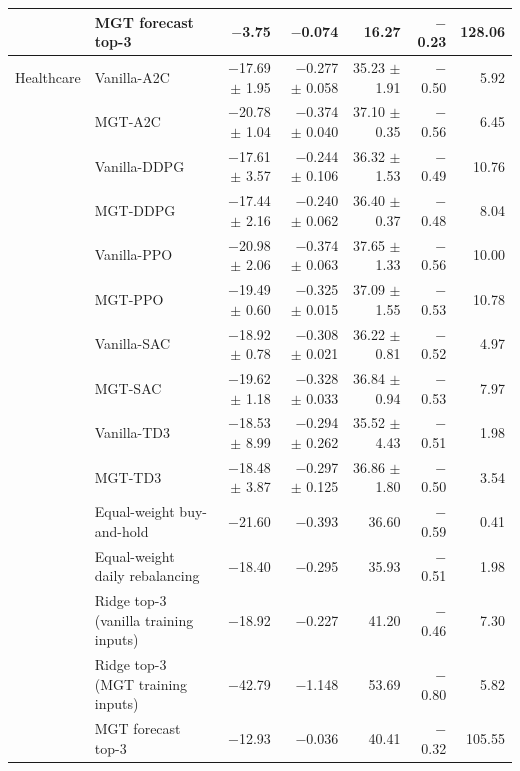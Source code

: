 \begin{table}[!t]
{\begin{tabular}{llrrrrr}
 & MGT forecast top-3 & $-$3.75 & $-$0.074 & 16.27 & $-$0.23 & 128.06 \\
\midrule
Healthcare & Vanilla-A2C & $-$17.69 $\pm$ 1.95 & $-$0.277 $\pm$ 0.058 & 35.23 $\pm$ 1.91 & $-$0.50 & 5.92 \\
 & MGT-A2C & $-$20.78 $\pm$ 1.04 & $-$0.374 $\pm$ 0.040 & 37.10 $\pm$ 0.35 & $-$0.56 & 6.45 \\
 & Vanilla-DDPG & $-$17.61 $\pm$ 3.57 & $-$0.244 $\pm$ 0.106 & 36.32 $\pm$ 1.53 & $-$0.49 & 10.76 \\
 & MGT-DDPG & $-$17.44 $\pm$ 2.16 & $-$0.240 $\pm$ 0.062 & 36.40 $\pm$ 0.37 & $-$0.48 & 8.04 \\
 & Vanilla-PPO & $-$20.98 $\pm$ 2.06 & $-$0.374 $\pm$ 0.063 & 37.65 $\pm$ 1.33 & $-$0.56 & 10.00 \\
 & MGT-PPO & $-$19.49 $\pm$ 0.60 & $-$0.325 $\pm$ 0.015 & 37.09 $\pm$ 1.55 & $-$0.53 & 10.78 \\
 & Vanilla-SAC & $-$18.92 $\pm$ 0.78 & $-$0.308 $\pm$ 0.021 & 36.22 $\pm$ 0.81 & $-$0.52 & 4.97 \\
 & MGT-SAC & $-$19.62 $\pm$ 1.18 & $-$0.328 $\pm$ 0.033 & 36.84 $\pm$ 0.94 & $-$0.53 & 7.97 \\
 & Vanilla-TD3 & $-$18.53 $\pm$ 8.99 & $-$0.294 $\pm$ 0.262 & 35.52 $\pm$ 4.43 & $-$0.51 & 1.98 \\
 & MGT-TD3 & $-$18.48 $\pm$ 3.87 & $-$0.297 $\pm$ 0.125 & 36.86 $\pm$ 1.80 & $-$0.50 & 3.54 \\
 & Equal-weight buy-and-hold & $-$21.60 & $-$0.393 & 36.60 & $-$0.59 & 0.41 \\
 & Equal-weight daily rebalancing & $-$18.40 & $-$0.295 & 35.93 & $-$0.51 & 1.98 \\
 & Ridge top-3 (vanilla training inputs) & $-$18.92 & $-$0.227 & 41.20 & $-$0.46 & 7.30 \\
 & Ridge top-3 (MGT training inputs) & $-$42.79 & $-$1.148 & 53.69 & $-$0.80 & 5.82 \\
 & MGT forecast top-3 & $-$12.93 & $-$0.036 & 40.41 & $-$0.32 & 105.55 \\
\bottomrule
\end{tabular}}\end{table}